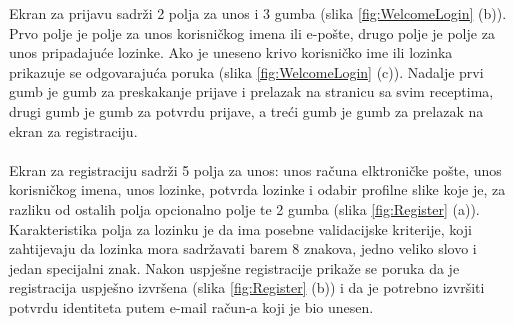 \documentclass[times, utf8, zavrsni]{fer}
\begin{document}
Ekran za prijavu sadrži 2 polja za unos i 3 gumba (slika \ref{fig:WelcomeLogin} (b)). Prvo polje je polje za unos
korisničkog imena ili e-pošte, drugo polje je polje za unos pripadajuće lozinke. Ako je uneseno
krivo korisničko ime ili lozinka prikazuje se odgovarajuća poruka (slika \ref{fig:WelcomeLogin} (c)). Nadalje
prvi gumb je gumb za preskakanje prijave i prelazak na stranicu sa svim receptima, drugi gumb je gumb
za potvrdu prijave, a treći gumb je gumb za prelazak na ekran za registraciju.
\\\\
Ekran za registraciju sadrži 5 polja za unos: unos računa elktroničke pošte, unos
korisničkog imena, unos lozinke, potvrda lozinke i odabir profilne slike koje je, za
razliku od ostalih polja opcionalno polje te 2 gumba (slika \ref{fig:Register} (a)). Karakteristika polja za lozinku je da ima posebne
validacijske kriterije, koji zahtijevaju da lozinka mora
sadržavati barem 8 znakova, jedno veliko slovo i jedan specijalni znak. Nakon uspješne registracije
prikaže se poruka da je registracija uspješno izvršena (slika \ref{fig:Register} (b)) i da je potrebno izvršiti potvrdu identiteta
putem e-mail račun-a koji je bio unesen.
\end{document}
